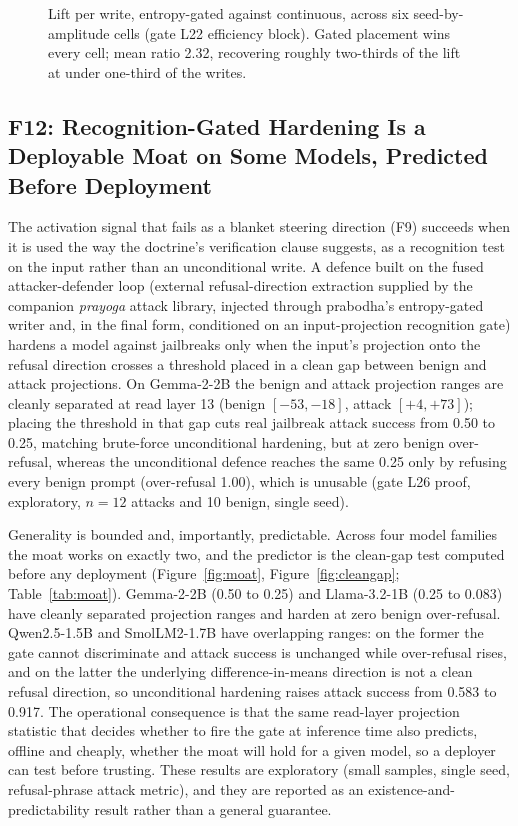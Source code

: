 \begin{figure}[t]
\centering
\resizebox{\columnwidth}{!}{}
\caption{Lift per write, entropy-gated against continuous, across six seed-by-amplitude cells (gate L22 efficiency block). Gated placement wins every cell; mean ratio 2.32, recovering roughly two-thirds of the lift at under one-third of the writes.}
\label{fig:efficiency}
\end{figure}

\subsection{F12: Recognition-Gated Hardening Is a Deployable Moat on Some Models, Predicted Before Deployment}
\label{sec:results:moat}

The activation signal that fails as a blanket steering direction (F9) succeeds when it is used the way the doctrine's verification clause suggests, as a recognition test on the input rather than an unconditional write. A defence built on the fused attacker-defender loop (external refusal-direction extraction supplied by the companion \emph{prayoga} attack library, injected through prabodha's entropy-gated writer and, in the final form, conditioned on an input-projection recognition gate) hardens a model against jailbreaks only when the input's projection onto the refusal direction crosses a threshold placed in a clean gap between benign and attack projections. On Gemma-2-2B the benign and attack projection ranges are cleanly separated at read layer 13 (benign $[-53,-18]$, attack $[+4,+73]$); placing the threshold in that gap cuts real jailbreak attack success from 0.50 to 0.25, matching brute-force unconditional hardening, but at zero benign over-refusal, whereas the unconditional defence reaches the same 0.25 only by refusing every benign prompt (over-refusal 1.00), which is unusable (gate L26 proof, exploratory, $n=12$ attacks and 10 benign, single seed).

Generality is bounded and, importantly, predictable. Across four model families the moat works on exactly two, and the predictor is the clean-gap test computed before any deployment (Figure~\ref{fig:moat}, Figure~\ref{fig:cleangap}; Table~\ref{tab:moat}). Gemma-2-2B (0.50 to 0.25) and Llama-3.2-1B (0.25 to 0.083) have cleanly separated projection ranges and harden at zero benign over-refusal. Qwen2.5-1.5B and SmolLM2-1.7B have overlapping ranges: on the former the gate cannot discriminate and attack success is unchanged while over-refusal rises, and on the latter the underlying difference-in-means direction is not a clean refusal direction, so unconditional hardening raises attack success from 0.583 to 0.917. The operational consequence is that the same read-layer projection statistic that decides whether to fire the gate at inference time also predicts, offline and cheaply, whether the moat will hold for a given model, so a deployer can test before trusting. These results are exploratory (small samples, single seed, refusal-phrase attack metric), and they are reported as an existence-and-predictability result rather than a general guarantee.

